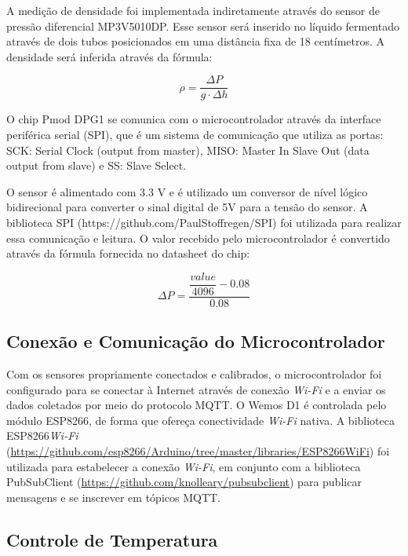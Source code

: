 A medição de densidade foi implementada indiretamente através do sensor de pressão diferencial MP3V5010DP. Esse sensor será inserido no líquido fermentado através de dois tubos posicionados em uma distância fixa de 18 centímetros. A densidade será inferida através da fórmula: 

\begin{equation}
    \rho = \dfrac{\Delta P}{g \cdot \Delta h}
\end{equation}

O chip Pmod DPG1 se comunica com o microcontrolador através da interface periférica serial (SPI), que é um sistema de comunicação que utiliza as portas: SCK: Serial Clock (output from master), MISO: Master In Slave Out (data output from slave) e SS: Slave Select.

O sensor é alimentado com 3.3 V e é utilizado um conversor de nível lógico bidirecional para converter o sinal digital de 5V para a tensão do sensor. A biblioteca SPI (https://github.com/PaulStoffregen/SPI) foi utilizada para realizar essa comunicação e leitura. O valor recebido pelo microcontrolador é convertido através da fórmula fornecida no datasheet do chip:

\begin{equation}
    \Delta P = \dfrac{\dfrac{value}{4096} - 0.08}{0.08} 
\end{equation}

\subsection{Conexão e Comunicação do Microcontrolador}

Com os sensores propriamente conectados e calibrados, o microcontrolador foi configurado para se conectar à Internet através de conexão \textit{Wi-Fi} e a enviar os dados coletados por meio do protocolo MQTT. O Wemos D1 é controlada pelo módulo ESP8266, de forma que ofereça conectividade \textit{Wi-Fi} nativa. 
A biblioteca ESP8266\textit{Wi-Fi} (\url{https://github.com/esp8266/Arduino/tree/master/libraries/ESP8266WiFi}) foi utilizada para estabelecer a conexão \textit{Wi-Fi}, em conjunto com a biblioteca PubSubClient (\url{https://github.com/knolleary/pubsubclient}) para publicar mensagens e se inscrever em tópicos MQTT. 




\subsection{Controle de Temperatura}

